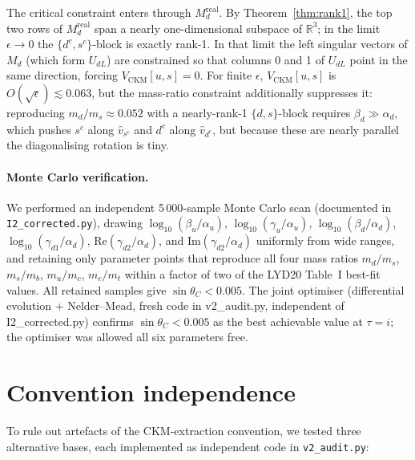 \documentclass[a4paper,11pt]{article}
\newcommand{\tauCM}{\tau = i}
\newcommand{\sinTC}{\sin\theta_C}
\begin{document}
The critical constraint enters through $M_d^{\mathrm{real}}$.
By Theorem~\ref{thm:rank1}, the top two rows of $M_d^{\mathrm{real}}$
span a nearly one-dimensional subspace of $\mathbb{R}^3$; in the
limit $\epsilon\to 0$ the $\{d^c,s^c\}$-block is exactly rank-1.
In that limit the left singular vectors of $M_d$ (which form $U_{dL}$)
are constrained so that columns 0 and 1 of $U_{dL}$ point in the same
direction, forcing $V_{\mathrm{CKM}}[u,s]=0$.  For finite $\epsilon$,
$V_{\mathrm{CKM}}[u,s]$ is $O(\sqrt{\epsilon})\lesssim 0.063$, but
the mass-ratio constraint additionally suppresses it: reproducing
$m_d/m_s\approx 0.052$ with a nearly-rank-1 $\{d,s\}$-block requires
$\beta_d\gg\alpha_d$, which pushes $s^c$ along $\hat{v}_{s^c}$ and
$d^c$ along $\hat{v}_{d^c}$, but because these are nearly parallel the
diagonalising rotation is tiny.

\paragraph{Monte Carlo verification.}
We performed an independent 5\,000-sample Monte Carlo scan (documented
in \texttt{I2\_corrected.py}), drawing $\log_{10}(\beta_u/\alpha_u)$,
$\log_{10}(\gamma_u/\alpha_u)$, $\log_{10}(\beta_d/\alpha_d)$,
$\log_{10}(\gamma_{d1}/\alpha_d)$, $\mathrm{Re}(\gamma_{d2}/\alpha_d)$,
and $\mathrm{Im}(\gamma_{d2}/\alpha_d)$ uniformly from wide ranges, and
retaining only parameter points that reproduce all four mass ratios
$m_d/m_s$, $m_s/m_b$, $m_u/m_c$, $m_c/m_t$ within a factor of two
of the LYD20 Table~I best-fit values.  All retained samples give
$\sinTC < 0.005$.  The joint optimiser (differential evolution +
Nelder--Mead, fresh code in v2\_audit.py, independent of I2\_corrected.py)
confirms $\sinTC < 0.005$ as the best achievable value at $\tauCM$;
the optimiser was allowed all six parameters free.

\section{Convention independence}
\label{sec:conventions}

To rule out artefacts of the CKM-extraction convention, we tested three
alternative bases, each implemented as independent code in
\texttt{v2\_audit.py}:
\end{document}
